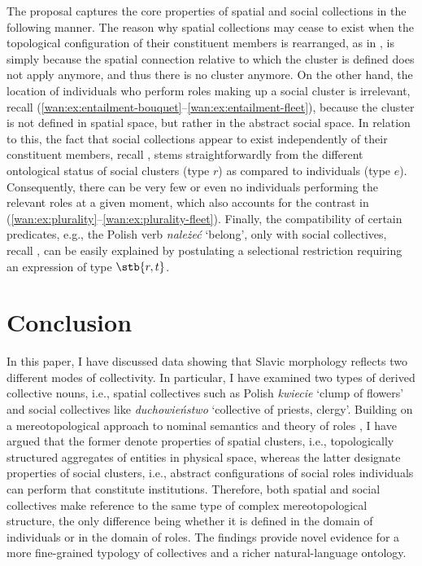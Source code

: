 \documentclass[output=paper]{langscibook}
\begin{document}
The proposal captures the core properties of spatial and social collections in the following manner. The reason why spatial collections may cease to exist when the topological configuration of their constituent members is rearranged, as in , is simply because the spatial connection relative to which the cluster is defined does not apply anymore, and thus there is no cluster anymore. On the other hand, the location of individuals who perform roles making up a social cluster is irrelevant, recall (\ref{wan:ex:entailment-bouquet}--\ref{wan:ex:entailment-fleet}), because the cluster is not defined in spatial space, but rather in the abstract social space. In relation to this, the fact that social collections appear to exist independently of their constituent members, recall , stems straightforwardly from the different ontological status of social clusters (type $r$) as compared to individuals (type $e$). Consequently, there can be very few or even no individuals performing the relevant roles at a given moment, which also accounts for the contrast in (\ref{wan:ex:plurality}--\ref{wan:ex:plurality-fleet}). Finally, the compatibility of certain predicates, e.g., the Polish verb \textit{należeć} `belong', only with social collectives, recall , can be easily explained by postulating a selectional restriction requiring an expression of type $\stb{r,t}$.

\section{Conclusion}\label{wan:sec:conclusion}

In this paper, I have discussed data showing that Slavic morphology reflects two different modes of collectivity. In particular, I have examined two types of derived collective nouns, i.e., spatial collectives such as Polish \textit{kwiecie} `clump of flowers' and social collectives like \textit{duchowieństwo} `collective of priests, clergy'. Building on a mereotopological approach to nominal semantics \citep{grimm2012number} and theory of roles \citep{zobel2017sensitivity}, I have argued that the former denote properties of spatial clusters, i.e., topologically structured aggregates of entities in physical space, whereas the latter designate properties of social clusters, i.e., abstract configurations of social roles individuals can perform that constitute institutions. Therefore, both spatial and social collectives make reference to the same type of complex mereotopological structure, the only difference being whether it is defined in the domain of individuals or in the domain of roles. The findings provide novel evidence for a more fine-grained typology of collectives and a richer natural-language ontology.
\end{document}
